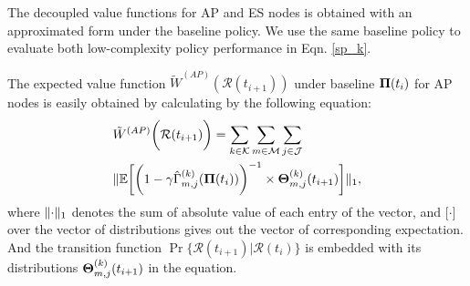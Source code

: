 The decoupled value functions for AP and ES nodes is obtained with an approximated form under the baseline policy. We use the same baseline policy to evaluate both low-complexity policy performance in Eqn. \ref{sp_k}.
        
The expected value function $\tilde{W}^{(AP)}(\mathcal{R}(t_{i+1}))$ under baseline $\boldsymbol{\Pi}(t_{i})$ for AP nodes is easily obtained by calculating by the following equation:
\begin{align}
    &\tilde{W}^{(AP)}\bigg(\mathcal{R}(t_{i+1})\bigg) = \sum_{k\in\mathcal{K}}\sum_{m\in\mathcal{M}}\sum_{j\in\mathcal{J}}
    \nonumber\\
    & \lVert
        \mathbb{E}\bigg[
            \bigg(
                1 - \gamma \hat{\Gamma}^{(k)}_{m,j}(\boldsymbol{\Pi}(t_{i}))
            \bigg)^{-1} \times \boldsymbol{\Theta}^{(k)}_{m,j}(t_{i+1})
        \bigg]
    \|_1,
    \label{w_ap}
\end{align}
where $\lVert\cdot\|_1$ denotes the sum of absolute value of each entry of the vector, and $\mathbb[\cdot]$ over the vector of distributions gives out the vector of corresponding expectation. And the transition function $\Pr\{ \mathcal{R}(t_{i+1})|\mathcal{R}(t_{i}) \}$ is embedded with its distributions $\boldsymbol{\Theta}^{(k)}_{m,j}(t_{i+1})$ in the equation.


